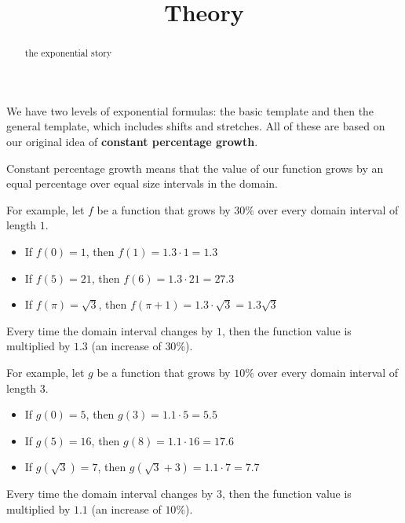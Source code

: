 \documentclass{ximera}
\title{Theory}
\begin{document}
\begin{abstract}
the exponential story
\end{abstract}
\maketitle





We have two levels of exponential formulas: the basic template and then the general template, which includes shifts and stretches.  All of these are based on our original idea of \textbf{\textcolor{purple!85!blue}{constant percentage growth}}.


Constant percentage growth means that the value  of our function grows by an equal percentage over equal size intervals in the domain.



For example, let $f$ be a function that grows by $30\%$ over every domain interval of length $1$. \\


\begin{itemize}
\item If $f(0) = 1$, then $f(1) = 1.3 \cdot 1 = 1.3$
\item If $f(5) = 21$, then $f(6) = 1.3 \cdot 21 = 27.3$
\item If $f(\pi) = \sqrt{3}$, then $f(\pi + 1) = 1.3 \cdot \sqrt{3} = 1.3 \sqrt{3}$
\end{itemize}

Every time the domain interval changes by $1$, then the function value is multiplied by $1.3$ (an increase of $30\%$).






For example, let $g$ be a function that grows by $10\%$ over every domain interval of length $3$. \\


\begin{itemize}
\item If $g(0) = 5$, then $g(3) = 1.1 \cdot 5  = 5.5$
\item If $g(5) = 16$, then $g(8) = 1.1 \cdot 16  = 17.6$
\item If $g(\sqrt{3}) = 7$, then $g(\sqrt{3} + 3) = 1.1 \cdot 7 = 7.7$
\end{itemize}

Every time the domain interval changes by $3$, then the function value is multiplied by $1.1$ (an increase of $10\%$).
\end{document}
